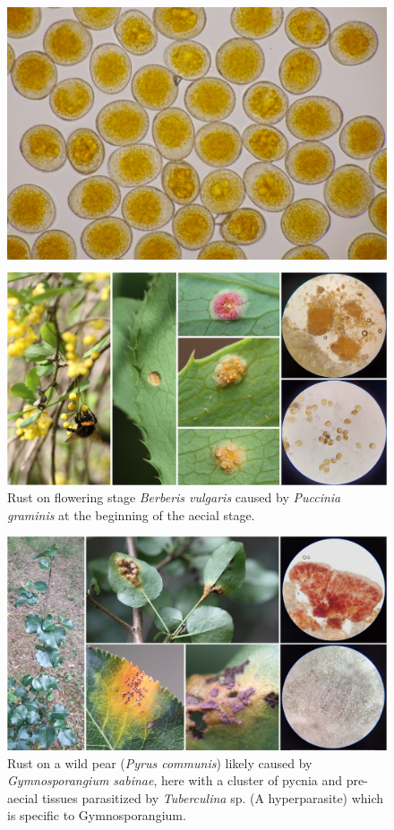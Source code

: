 \documentclass[10pt,dvipsnames,ignorenonframetext,aspectratio=169]{beamer}
\begin{document}
\begin{frame}{}
\begin{figure}
\begin{columns}
\includegraphics[width=0.6\linewidth]{../images/FYCo7NrXkAAOJZh}\end{columns}\end{figure}
\end{frame}

\begin{frame}{}
\protect\hypertarget{section-13}{}
\begin{figure}
\includegraphics[width=0.36\linewidth]{../images/FRruRoiX0AE_dF0} \caption{Rust on flowering stage \textit{Berberis vulgaris} caused by \textit{Puccinia graminis} at the beginning of the aecial stage.}\label{fig:berberis-rust}
\end{figure}

\begin{figure}
\includegraphics[width=0.38\linewidth]{../images/Fa1rQDGWAAAa8pu} \caption{Rust on a wild pear (\textit{Pyrus communis}) likely caused by \textit{Gymnosporangium sabinae}, here with a cluster of pycnia and pre-aecial tissues parasitized by \textit{Tuberculina} sp. (A hyperparasite) which is specific to Gymnosporangium.}\label{fig:pear-rust}
\end{figure}
\end{frame}
\end{document}
